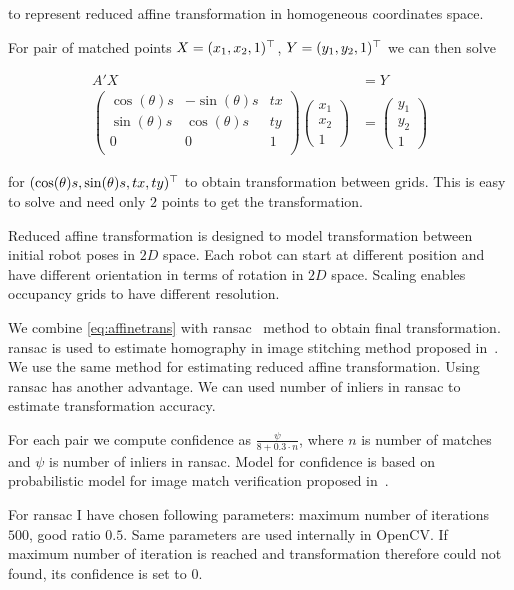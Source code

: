 to represent reduced affine transformation in homogeneous coordinates space.

For pair of matched points $X=(x_1,x_2,1)^\top$, $Y=(y_1, y_2, 1)^\top$ we can then solve

\begin{align}
    A'X &= Y \label{eq:affinetrans}\\
    \begin{pmatrix}
        \cos(\theta)s & -\sin(\theta)s & tx \\
        \sin(\theta)s & \cos(\theta)s & ty \\
        0 & 0 & 1 \\
    \end{pmatrix}
    \begin{pmatrix}
        x_1 \\
        x_2 \\
        1
    \end{pmatrix}
    &=
    \begin{pmatrix}
        y_1 \\
        y_2 \\
        1
    \end{pmatrix}
\end{align}

for $(\cos(\theta)s, \sin(\theta)s, tx, ty)^\top$ to obtain transformation between grids. This is easy to solve and need only $2$ points to get the transformation.

Reduced affine transformation is designed to model transformation between initial robot poses in $2D$ space. Each robot can start at different position and have different orientation in terms of rotation in $2D$ space. Scaling enables occupancy grids to have different resolution.

We combine \eqref{eq:affinetrans} with \gls{ransac}~\cite{fischler1981random} method to obtain final transformation. \gls{ransac} is used to estimate homography in image stitching method proposed in~\cite{Brown2006}. We use the same method for estimating reduced affine transformation. Using \gls{ransac} has another advantage. We can used number of inliers in \gls{ransac} to estimate transformation accuracy.

For each pair we compute confidence as $\frac{\psi}{8 + 0.3 \cdot n}$, where $n$ is number of matches and $\psi$ is number of inliers in \gls{ransac}. Model for confidence is based on probabilistic model for image match verification proposed in~\cite{Brown2006}.

For \gls{ransac} I have chosen following parameters: maximum number of iterations $500$, good ratio $0.5$. Same parameters are used internally in OpenCV. If maximum number of iteration is reached and transformation therefore could not found, its confidence is set to $0$.


